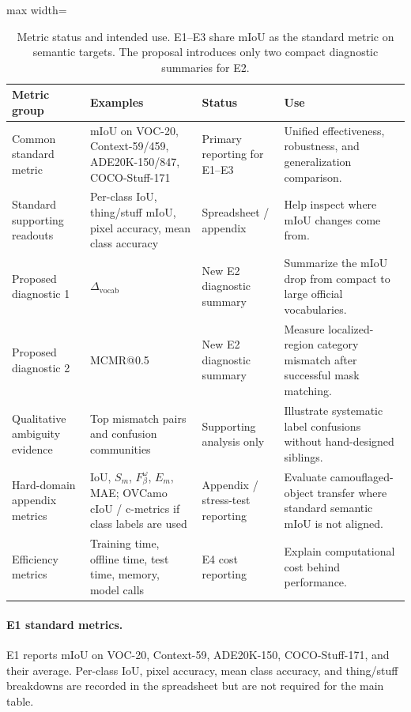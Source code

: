 \documentclass[11pt,a4paper]{article}
\begin{document}
\begin{table}[!htbp]
\centering
\scriptsize
\caption{Metric status and intended use. E1--E3 share mIoU as the standard metric on semantic targets. The proposal introduces only two compact diagnostic summaries for E2.}
\label{tab:metric-status}
\setlength{\tabcolsep}{3pt}
\begin{adjustbox}{max width=\textwidth}
\begin{tabular}{p{} p{} p{} p{}}
\toprule
Metric group & Examples & Status & Use \\
\midrule
Common standard metric & mIoU on VOC-20, Context-59/459, ADE20K-150/847, COCO-Stuff-171 & Primary reporting for E1--E3 & Unified effectiveness, robustness, and generalization comparison. \\
Standard supporting readouts & Per-class IoU, thing/stuff mIoU, pixel accuracy, mean class accuracy & Spreadsheet / appendix & Help inspect where mIoU changes come from. \\
Proposed diagnostic 1 & $\Delta_{\mathrm{vocab}}$ & New E2 diagnostic summary & Summarize the mIoU drop from compact to large official vocabularies. \\
Proposed diagnostic 2 & MCMR@0.5 & New E2 diagnostic summary & Measure localized-region category mismatch after successful mask matching. \\
Qualitative ambiguity evidence & Top mismatch pairs and confusion communities & Supporting analysis only & Illustrate systematic label confusions without hand-designed siblings. \\
Hard-domain appendix metrics & IoU, $S_m$, $F^\omega_\beta$, $E_m$, MAE; OVCamo cIoU / c-metrics if class labels are used & Appendix / stress-test reporting & Evaluate camouflaged-object transfer where standard semantic mIoU is not aligned. \\
Efficiency metrics & Training time, offline time, test time, memory, model calls & E4 cost reporting & Explain computational cost behind performance. \\
\bottomrule
\end{tabular}
\end{adjustbox}
\end{table}

\paragraph{E1 standard metrics.}
E1 reports mIoU on VOC-20, Context-59, ADE20K-150, COCO-Stuff-171, and their average. Per-class IoU, pixel accuracy, mean class accuracy, and thing/stuff breakdowns are recorded in the spreadsheet but are not required for the main table.
\end{document}
